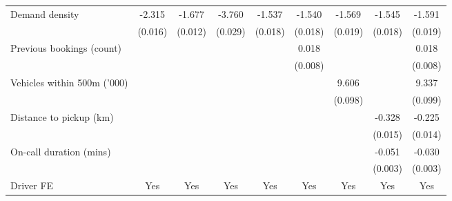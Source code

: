 \documentclass[reviewmode]{restud}
\begin{document}
\begin{landscape}
\begin{table}
{\begin{tabular}{l*{8}{S}}
				\addlinespace
				Demand density      &      -2.315&      -1.677&      -3.760&      -1.537&      -1.540&      -1.569&      -1.545&      -1.591\\
				                    &     (0.016)         &     (0.012)         &     (0.029)         &     (0.018)         &     (0.018)         &     (0.019)         &     (0.018)         &     (0.019)         \\
				\addlinespace
				Previous bookings (count)&                     &                     &                     &                     &       0.018 &                     &                     &       0.018 \\
				                    &                     &                     &                     &                     &     (0.008)         &                     &                     &     (0.008)         \\
				\addlinespace
				Vehicles within 500m ('000)&                     &                     &                     &                     &                     &       9.606&                     &       9.337\\
				                    &                     &                     &                     &                     &                     &     (0.098)         &                     &     (0.099)         \\
				\addlinespace
				Distance to pickup (km)&                     &                     &                     &                     &                     &                     &      -0.328&      -0.225\\
				                    &                     &                     &                     &                     &                     &                     &     (0.015)         &     (0.014)         \\
				\addlinespace
				On-call duration (mins)&                     &                     &                     &                     &                     &                     &      -0.051&      -0.030\\
				                    &                     &                     &                     &                     &                     &                     &     (0.003)         &     (0.003)         \\
				\addlinespace
				Driver FE           &       {Yes}         &       {Yes}         &       {Yes}         &       {Yes}         &       {Yes}         &       {Yes}         &       {Yes}         &       {Yes}         \\

\end{tabular}}
\end{table}
\end{landscape}
\end{document}
